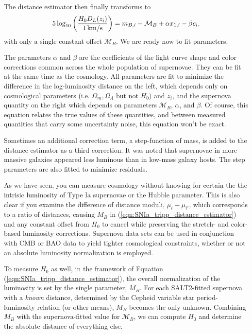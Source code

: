 The distance estimator then finally transforms to
\begin{equation}
  5 \log_{10} \left(  \frac{H_0 D_L(z_i)}{\mbox{1\,km/s}} \right)
  = m_{B,i} - \mathcal{M}_B + \alpha x_{1,i} - \beta c_i, \label{eqn:tripp_single_offset}
\end{equation}
 with only a single constant offset $\mathcal{M}_B$.  We are ready now to fit parameters.
 
 The parameters $\alpha$ and $\beta$ are the coefficients of the light curve shape and color corrections common across the whole population of supernovae.   They can be fit at the same time as the cosmology.  All parameters are fit to minimize the difference in the log-luminosity distance on the left, which depends only on cosmological parameters (i.e. $\Omega_m,\Omega_\Lambda$ but not $H_0$) and $z_i$, and the supernova quantity on the right which depends on parameters $\mathcal{M}_B$, $\alpha$, and $\beta$.  Of course, this equation relates the true values of these quantities, and between measured quantities that carry some uncertainty noise, this equation won't be exact.

Sometimes an additional correction term, a step-function of mass, is added to the distance estimator as a third correction.  It was noted that supernovae in more massive galaxies appeared less luminous than in low-mass galaxy hosts.  The step parameters are also fitted to minimize residuals.

As we have seen, you can measure cosmology without knowing for certain the the intrisic luminosity of Type Ia supernovae or the Hubble parameter.  This is also clear if you examine the  difference of distance moduli, $\mu_i - \mu_{i'}$, which corresponds to a ratio of distances, causing ${M}_B$ in (\ref{eqn:SNIa_tripp_distance_estimator}) and any constant offset from $H_0$ to cancel while preserving the stretch- and color-based luminosity corrections.
Supernova data sets can be used in conjunction with CMB or BAO data to yield tighter cosmological constraints, whether or not an absolute luminosity normalization is employed.  %

To measure $H_0$ as well, in the framework of Equation (\ref{eqn:SNIa_tripp_distance_estimator}), the overall normalization of the luminosity is set by the single parameter, $M_B$.  For each SALT2-fitted supernova with a \textit{known} distance, determined by the Cepheid variable star period-luminosity relation (or other means), $M_B$ becomes the only unknown.   Combining $M_B$ with the supernova-fitted value for $\mathcal{M}_B$, we can compute $H_0$ and determine the absolute distance of everything else.

